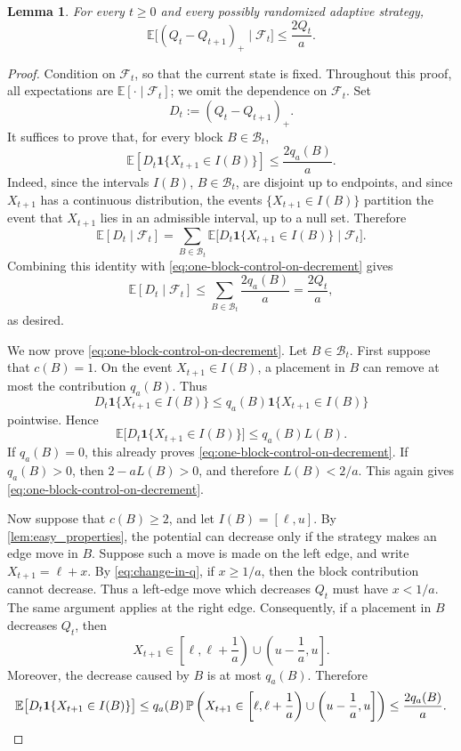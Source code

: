 \documentclass[11pt,reqno,letterpaper]{amsart}
\newtheorem{lemma}[theorem]{Lemma}
\theoremstyle{definition}
\numberwithin{equation}{section}
\newcommand{\E}{\mathbb{E}}
\renewcommand{\P}{\mathbb{P}}
\newcommand{\mc}{\mathcal}
\newcommand{\mb}{\mathbb}
\newcommand{\mbf}{\mathbf}
\begin{document}

\begin{lemma}\label{lem:expected_positive_decrement}
For every \(t\ge0\) and every possibly randomized adaptive strategy,
\[
\E\bigl[(Q_t-Q_{t+1})_+\mid \mathcal F_t\bigr]
\le
\frac{2Q_t}{a}.
\]
\end{lemma}

\begin{proof}
Condition on \(\mathcal F_t\), so that the current state is fixed. Throughout this proof, all expectations are $\mb{E}[\cdot\mid\mc{F}_t]$; we omit the dependence on $\mc{F}_t$. Set
\[
D_t:=(Q_t-Q_{t+1})_+.
\]
It suffices to prove that, for every block $B \in \mc{B}_t$,
\begin{equation}\label{eq:one-block-control-on-decrement} \mb{E}[D_t \mbf1\{ X_{t+1} \in I(B) \} ] \leq \frac{2q_a(B)}{a}. \end{equation}
Indeed, since the intervals \(I(B)\), \(B\in\mc B_t\), are disjoint up to endpoints, and since \(X_{t+1}\) has a continuous distribution, the events \(\{X_{t+1}\in I(B)\}\) partition the event that \(X_{t+1}\) lies in an admissible interval, up to a null set. Therefore
\[
\E[D_t\mid \mc F_t]
=
\sum_{B\in\mc B_t}
\E\bigl[D_t\mbf1\{X_{t+1}\in I(B)\}\mid \mc F_t\bigr].
\]
Combining this identity with \eqref{eq:one-block-control-on-decrement} gives
\[
\E[D_t\mid \mc F_t]
\le
\sum_{B\in\mc B_t}\frac{2q_a(B)}{a}
=
\frac{2Q_t}{a},
\]
as desired.



We now prove \eqref{eq:one-block-control-on-decrement}. Let $B \in \mc{B}_t$. First suppose that \(c(B)=1\).  On the event \(X_{t+1}\in I(B)\), a placement in \(B\) can remove at most the contribution \(q_a(B)\).  Thus
\[
D_t\mbf1\{X_{t+1}\in I(B)\}
\le
q_a(B)\mbf1\{X_{t+1}\in I(B)\}
\]
pointwise.  Hence
\[
\E\bigl[D_t\mbf1\{X_{t+1}\in I(B)\}\bigr]
\le
q_a(B)L(B).
\]
If \(q_a(B)=0\), this already proves \eqref{eq:one-block-control-on-decrement}.  If \(q_a(B)>0\), then \(2-aL(B)>0\), and therefore \(L(B)<2/a\).  This again gives \eqref{eq:one-block-control-on-decrement}.

Now suppose that \(c(B)\ge2\), and let \(I(B)=[\ell,u]\).  By \cref{lem:easy_properties}, the potential can decrease only if the strategy makes an edge move in \(B\).  Suppose such a move is made on the left edge, and write \(X_{t+1}=\ell+x\).  By \eqref{eq:change-in-q}, if \(x\ge1/a\), then the block contribution cannot decrease.  Thus a left-edge move which decreases \(Q_t\) must have \(x<1/a\).  The same argument applies at the right edge.  Consequently, if a placement in \(B\) decreases \(Q_t\), then
\[
X_{t+1}\in
\left[\ell,\ell+\frac1a\right)
\cup
\left(u-\frac1a,u\right].
\]
Moreover, the decrease caused by \(B\) is at most \(q_a(B)\).  Therefore
\[
\E\bigl[D_t\mbf1\{X_{t+1}\in I(B)\}\bigr]
\le
q_a(B)\,
\P\left(
X_{t+1}\in
\left[\ell,\ell+\frac1a\right)
\cup
\left(u-\frac1a,u\right]
\right)
\le
\frac{2q_a(B)}{a}. \qedhere
\]

\end{proof}
\end{document}
